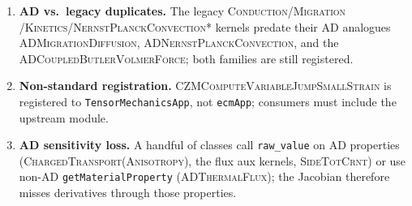 \documentclass[11pt]{article}
\begin{document}
\begin{enumerate}
\begin{itemize}
    \end{itemize}
  \item \textbf{AD vs.\ legacy duplicates.} The legacy \textsc{Conduction}/\textsc{Migration}
    /\textsc{Kinetics}/\textsc{NernstPlanckConvection*} kernels predate their AD analogues
    \textsc{ADMigrationDiffusion}, \textsc{ADNernstPlanckConvection}, and the
    \textsc{ADCoupledButlerVolmerForce}; both families are still registered.
  \item \textbf{Non-standard registration.} \textsc{CZMComputeVariableJumpSmallStrain} is
    registered to \texttt{TensorMechanicsApp}, not \texttt{ecmApp}; consumers must include
    the upstream module.
  \item \textbf{AD sensitivity loss.} A handful of classes call \texttt{raw\_value} on AD
    properties (\textsc{ChargedTransport(Anisotropy)}, the flux aux kernels, \textsc{SideTotCrnt})
    or use non-AD \texttt{getMaterialProperty} (\textsc{ADThermalFlux}); the Jacobian therefore
    misses derivatives through those properties.
\end{enumerate}
\end{document}
